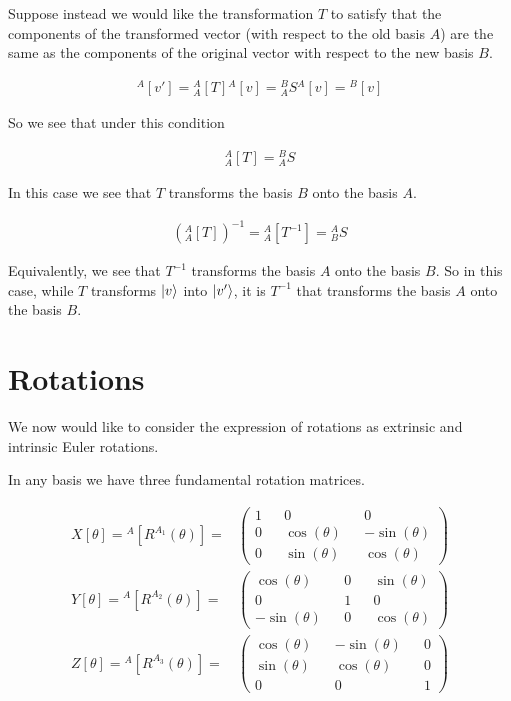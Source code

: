 \documentclass[12pt]{article}
\begin{document}
Suppose instead we would like the transformation $T$ to satisfy that the components of the transformed vector (with respect to the old basis $A$) are the same as the components of the original vector with respect to the new basis $B$.

\begin{align}
{^A[v']} = {^A_A[T]}{^A[v]} = {^B_A S} {^A[v]} = {^B[v]}
\end{align}

So we see that under this condition

\begin{align}
{^A_A[T]} = {^B_A S}
\end{align}

In this case we see that $T$ transforms the basis $B$ onto the basis $A$.

\begin{align}
\left({^A_A[T]}\right)^{-1} = {^A_A[T^{-1}]} = {^A_B S}
\end{align}

Equivalently, we see that $T^{-1}$ transforms the basis $A$ onto the basis $B$.
So in this case, while $T$ transforms $\ket{v}$ into $\ket{v'}$, it is $T^{-1}$ that transforms the basis $A$ onto the basis $B$.


\section{Rotations}

We now would like to consider the expression of rotations as extrinsic and intrinsic Euler rotations.

In any basis we have three fundamental rotation matrices.

\begin{align}
X[\theta] = {^A[R^{A_1}(\theta)]} =& \begin{pmatrix}
1 && 0 && 0\\
0 && \cos(\theta) && -\sin(\theta)\\
0 && \sin(\theta) && \cos(\theta)
\end{pmatrix}\\
Y[\theta] = {^A[R^{A_2}(\theta)]} =& \begin{pmatrix}
\cos(\theta) && 0 && \sin(\theta)\\
0 && 1 && 0\\
-\sin(\theta) && 0 && \cos(\theta)
\end{pmatrix}\\
Z[\theta] = {^A[R^{A_3}(\theta)]} =& \begin{pmatrix}
\cos(\theta) && -\sin(\theta) && 0\\
\sin(\theta) && \cos(\theta) && 0\\
0 && 0 && 1
\end{pmatrix}\\
\end{align}
\end{document}
